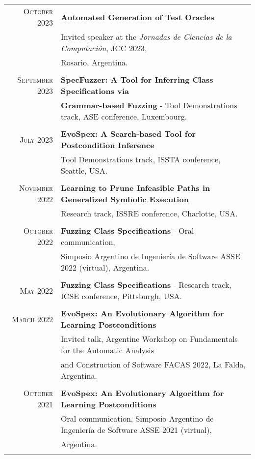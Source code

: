 \documentclass[a4paper,10pt]{article} %
\begin{document}
\begin{longtable}{rl}
\textsc{October} 2023  & \textbf{Automated Generation of Test Oracles} \\ 
& Invited speaker at the \textit{Jornadas de Ciencias de la Computación}, JCC 2023, \\ 
& Rosario, Argentina. \\ & \\

\textsc{September} 2023  & \textbf{SpecFuzzer: A Tool for Inferring Class Specifications via} \\ 
& \textbf{Grammar-based Fuzzing} - Tool Demonstrations track, ASE conference, Luxembourg. \\ & \\

\textsc{July} 2023 & \textbf{EvoSpex: A Search-based Tool for Postcondition Inference} \\ 
& Tool Demonstrations track, ISSTA conference, Seattle, USA. \\ & \\

\textsc{November} 2022 & \textbf{Learning to Prune Infeasible Paths in Generalized Symbolic Execution} \\
& Research track, ISSRE conference, Charlotte, USA. \\ & \\

\textsc{October} 2022 & \textbf{Fuzzing Class Specifications} - Oral communication, \\ 
& Simposio Argentino de Ingeniería de Software ASSE 2022 (virtual), Argentina. \\ & \\

\textsc{May} 2022 & \textbf{Fuzzing Class Specifications} - Research track, ICSE conference, Pittsburgh, USA. \\ & \\

\textsc{March} 2022 & \textbf{EvoSpex: An Evolutionary Algorithm for Learning Postconditions} \\ 
& Invited talk, Argentine Workshop on Fundamentals for the Automatic Analysis \\ 
& and Construction of Software FACAS 2022, La Falda, Argentina. \\ & \\

\textsc{October} 2021 & \textbf{EvoSpex: An Evolutionary Algorithm for Learning Postconditions} \\ 
& Oral communication, Simposio Argentino de Ingeniería de Software ASSE 2021 (virtual), \\ 
& Argentina. \\ & \\


\end{longtable}
\end{document}
